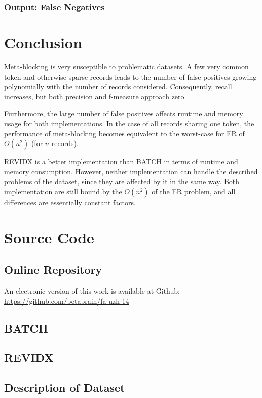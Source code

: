 \documentclass[a4paper,12pt]{article}
\begin{document}

\subsubsection{Output: False Negatives}


\section{Conclusion}
Meta-blocking is very susceptible to problematic datasets. A few very common token and otherwise sparse records leads to the number of false positives growing polynomially with the number of records considered. Consequently, recall increases, but both precision and f-measure approach zero.

Furthermore, the large number of false positives affects runtime and memory usage for both implementations. In the case of all records sharing one token, the performance of meta-blocking becomes equivalent to the worst-case for ER of $O(n^{2})$ (for $n$ records).

REVIDX is a better implementation than BATCH in terms of runtime and memory consumption. However, neither implementation can handle the described problems of the dataset, since they are affected by it in the same way. Both implementation are still bound by the $O(n^{2})$ of the ER problem, and all differences are essentially constant factors.




\appendix
\section{Source Code}
\subsection{Online Repository}
An electronic version of this work is available at Github: \\
\url{https://github.com/betabrain/fa-uzh-14}

\newpage
\subsection{BATCH}


\newpage
\subsection{REVIDX}


\newpage
\subsection{Description of Dataset}

\end{document}
